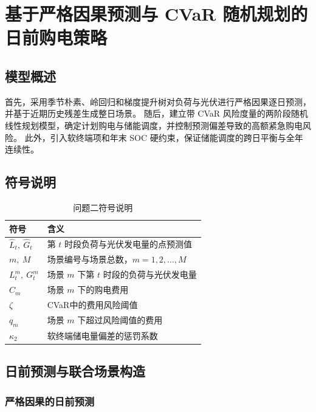 \section{基于严格因果预测与 CVaR 随机规划的日前购电策略}
\subsection{模型概述}
首先，采用季节朴素、岭回归和梯度提升树对负荷与光伏进行严格因果逐日预测，并基于近期历史残差生成整日场景。  
随后，建立带 CVaR 风险度量的两阶段随机线性规划模型，确定计划购电与储能调度，并控制预测偏差导致的高额紧急购电风险。  
此外，引入软终端项和年末 SOC 硬约束，保证储能调度的跨日平衡与全年连续性。

\subsection{符号说明}
\begin{table}[H]
    \centering
    \caption{问题二符号说明}
    \label{tab:q2_symbols}
    \renewcommand{\arraystretch}{1.35}
    \begin{tabularx}{0.92\textwidth}{
        >{\centering\arraybackslash}p{}
        >{\centering\arraybackslash}X}
        \toprule
        符号 & 含义 \\
        \midrule
        $\widehat{L}_t,\ \widehat{G}_t$
        & 第 $t$ 时段负荷与光伏发电量的点预测值 \\
        $m,\ M$
        & 场景编号与场景总数，$m=1,2,\ldots,M$ \\
        $L_t^m,\ G_t^m$
        & 场景 $m$ 下第 $t$ 时段的负荷与光伏发电量 \\
        $C_m$
        & 场景 $m$ 下的购电费用 \\
        $\zeta$
        & CVaR中的费用风险阈值 \\
        $q_m$
        & 场景 $m$ 下超过风险阈值的费用 \\
        $\kappa_2$
        & 软终端储电量偏差的惩罚系数 \\
        \bottomrule
    \end{tabularx}
\end{table}

\subsection{日前预测与联合场景构造}

\subsubsection{严格因果的日前预测}

